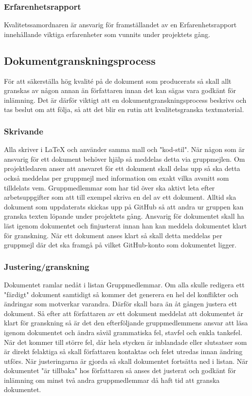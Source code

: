 \subsubsection{Erfarenhetsrapport}
Kvalitetssamordnaren är ansvarig för framställandet av en Erfarenhetsrapport innehållande viktiga erfarenheter som vunnits under projektets gång.

\subsection{Dokumentgranskningsprocess}
För att säkerställa hög kvalité på de dokument som producerats så skall allt granskas av någon annan än författaren innan det kan sägas vara godkänt för inlämning. Det är därför viktigt att en dokumentgranskningsprocess beskrivs och tas beslut om att följa, så att det blir en rutin att kvalitetsgranska textmaterial.

\subsubsection{Skrivande}
Alla skriver i LaTeX och använder samma mall och "kod-stil". När någon som är ansvarig för ett dokument behöver hjälp så meddelas detta via gruppmejlen. Om projektledaren anser att ansvaret för ett dokument skall delas upp så ska detta också meddelas per gruppmejl med information om exakt vilka avsnitt som tilldelats vem. Gruppmedlemmar som har tid över ska aktivt leta efter arbetsuppgifter som att till exempel skriva en del av ett dokument. Alltid ska dokument som uppdaterats skickas upp på GitHub så att andra ur gruppen kan granska texten löpande under projektets gång. Ansvarig för dokumentet skall ha läst igenom dokumentet och finjusterat innan han kan meddela dokumentet klart för granskning. När ett dokument anses klart så skall detta meddelas per gruppmejl där det ska framgå på vilket GitHub-konto som dokumentet ligger.

\subsubsection{Justering/granskning}
Dokumentet ramlar nedåt i listan Gruppmedlemmar. Om alla skulle redigera ett "färdigt" dokument samtidigt så kommer det generera en hel del konflikter och ändringar som motverkar varandra. Därför skall bara än åt gången justera ett dokument. Så efter att författaren av ett dokument meddelat att dokumentet är klart för granskning så är det den efterföljande gruppmedlemmens ansvar att läsa igenom dokumentet och ändra såväl grammatiska fel, stavfel och enkla tankefel. När det kommer till större fel, där hela stycken är inblandade eller slutsatser som är direkt felaktiga så skall författaren kontaktas och felet utredas innan ändring utförs. När justeringarna är gjorda så skall dokumentet fortsätta ned i listan. När dokumentet "är tillbaka" hos författaren så anses det justerat och godkänt för inlämning om minst två andra gruppmedlemmar då haft tid att granska dokumentet.

